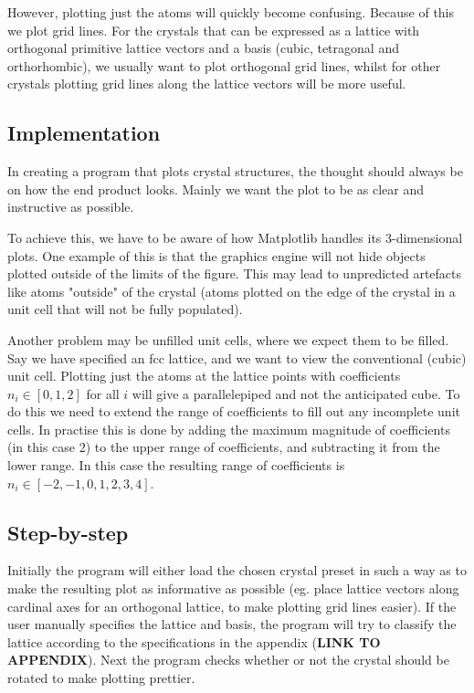 \documentclass[a4paper,10pt]{article}
\numberwithin{equation}{section}
\begin{document}
	However, plotting just the atoms will quickly become confusing. Because of this we plot grid lines. For the crystals that can be expressed as a lattice with orthogonal primitive lattice vectors and a basis (cubic, tetragonal and orthorhombic), we usually want to plot orthogonal grid lines, whilst for other crystals plotting grid lines along the lattice vectors will be more useful.
	
	
	\subsection{Implementation}
	In creating a program that plots crystal structures, the thought should always be on how the end product looks. Mainly we want the plot to be as clear and instructive as possible.
	
	To achieve this, we have to be aware of how Matplotlib handles its 3-dimensional plots. One example of this is that the graphics engine will not hide objects plotted outside of the limits of the figure. This may lead to unpredicted artefacts like atoms "outside" of the crystal (atoms plotted on the edge of the crystal in a unit cell that will not be fully populated).
	
	Another problem may be unfilled unit cells, where we expect them to be filled. Say we have specified an fcc lattice, and we want to view the conventional (cubic) unit cell. Plotting just the atoms at the lattice points with coefficients $ n_i \in [0,1,2] $ for all $ i $ will give a parallelepiped and not the anticipated cube. To do this we need to extend the range of coefficients to fill out any incomplete unit cells. In practise this is done by adding the maximum magnitude of coefficients (in this case 2) to the upper range of coefficients, and subtracting it from the lower range. In this case the resulting range of coefficients is $ n_i \in [-2, -1, 0, 1, 2, 3, 4] $.
	
	
	\subsection{Step-by-step}
	Initially the program will either load the chosen crystal preset in such a way as to make the resulting plot as informative as possible (eg. place lattice vectors along cardinal axes for an orthogonal lattice, to make plotting grid lines easier). If the user manually specifies the lattice and basis, the program will try to classify the lattice according to the specifications in the appendix (\textbf{LINK TO APPENDIX}). Next the program checks whether or not the crystal should be rotated to make plotting prettier.
	
\end{document}
